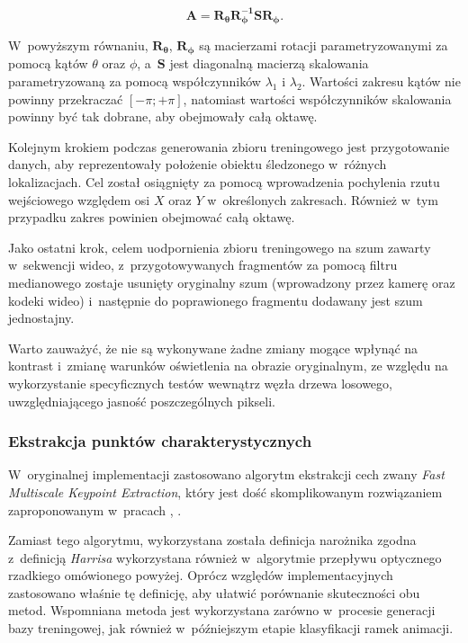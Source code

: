           \begin{equation}
            \mathbf{A} = \mathbf{R_{\theta}}\mathbf{R_{\phi}^{-1}}\mathbf{S}\mathbf{R_{\phi}}.
          \end{equation}

        W~powyższym równaniu, $\mathbf{R_{\theta}}$, $\mathbf{R_{\phi}}$ są macierzami rotacji parametryzowanymi za pomocą kątów $\theta$ oraz $\phi$, a~$\mathbf{S}$ jest diagonalną macierzą skalowania parametryzowaną za pomocą współczynników $\lambda_{1}$ i $\lambda_{2}$. Wartości zakresu kątów nie powinny przekraczać $[-\pi;+\pi]$, natomiast wartości współczynników skalowania powinny być tak dobrane, aby obejmowały całą oktawę.

        Kolejnym krokiem podczas generowania zbioru treningowego jest przygotowanie danych, aby reprezentowały położenie obiektu śledzonego w~różnych lokalizacjach. Cel został osiągnięty za pomocą wprowadzenia pochylenia rzutu wejściowego względem osi $X$ oraz $Y$ w~określonych zakresach. Również w~tym przypadku zakres powinien obejmować całą oktawę.

        Jako ostatni krok, celem uodpornienia zbioru treningowego na szum zawarty w~sekwencji wideo, z~przygotowywanych fragmentów za pomocą filtru medianowego zostaje usunięty oryginalny szum (wprowadzony przez kamerę oraz kodeki wideo) i~następnie do poprawionego fragmentu dodawany jest szum jednostajny.

        Warto zauważyć, że nie są wykonywane żadne zmiany mogące wpłynąć na kontrast i~zmianę warunków oświetlenia na obrazie oryginalnym, ze względu na wykorzystanie specyficznych testów wewnątrz węzła drzewa losowego, uwzględniającego jasność poszczególnych pikseli.

      \subsubsection{Ekstrakcja punktów charakterystycznych}
        W~oryginalnej implementacji zastosowano algorytm ekstrakcji cech zwany \textit{Fast Multiscale Keypoint Extraction}, który jest dość skomplikowanym rozwiązaniem zaproponowanym w~pracach \cite{RealTimeRandomizedTrees05}, \cite{RandomizedTrees06}.

        Zamiast tego algorytmu, wykorzystana została definicja narożnika zgodna z~definicją \textit{Harrisa} wykorzystana również w~algorytmie przepływu optycznego rzadkiego omówionego powyżej. Oprócz względów implementacyjnych zastosowano właśnie tę definicję, aby ułatwić porównanie skuteczności obu metod. Wspomniana metoda jest wykorzystana zarówno w~procesie generacji bazy treningowej, jak również w~późniejszym etapie klasyfikacji ramek animacji.


